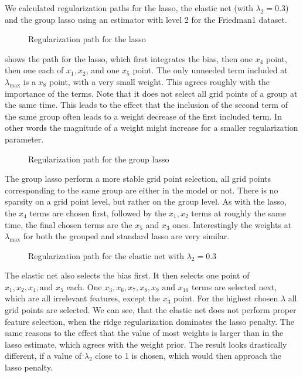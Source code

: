 We calculated regularization paths for the lasso, the elastic net (with
\(\lambda_2 = 0.3\)) and the group lasso using an estimator with level 2 for the
Friedman1 dataset.

\begin{figure}[hbt]
  \centering
  \caption{Regularization path for the lasso}\label{fig:path-lasso}
\end{figure}
 shows the path for the lasso, which first integrates the bias, then one \(x_4\) point, then
one each of \(x_1, x_2\), and one \(x_5\) point.
The only unneeded term included at \(\lambda_\text{max}\) is a \(x_8\) point,
with a very small weight.
This agrees roughly with the importance of the terms.
Note that it does not select all grid points of a group at the same time.
This leads to the effect that the inclusion of the second term of the same group
often leads to a weight decrease of the first included term.
In other words the magnitude of a weight might increase for a smaller
regularization parameter.

\begin{figure}[H]
  \centering
  \caption{Regularization path for the group lasso}
\end{figure}

The group lasso perform a more stable grid point selection, all grid points
corresponding to the same group are either in the model or not.
There is no sparsity on a grid point level, but rather on the group level.
As with the lasso, the \(x_4\) terms are chosen first, followed by the \(x_1,
x_2\) terms at roughly the same time, the final chosen terms are the \(x_5\) and
\(x_3\) ones.
Interestingly the weights at \(\lambda_\text{max}\) for both the grouped and
standard lasso are very similar.

\begin{figure}[H]
  \centering
  \caption{Regularization path for the elastic net with \(\lambda_2 = 0.3\)}
\end{figure}
The elastic net also selects the bias first.
It then selects one point of \(x_1, x_2, x_4,\text{and } x_5\) each.
One \(x_3, x_6, x_7, x_8, x_9 \text{ and } x_{10}\) terms are selected next,
which are all irrelevant features, except the \(x_3\) point.
For the highest chosen \(\lambda\) all grid points are selected.
We can see, that the elastic net does not perform proper feature selection, when
the ridge regularization dominates the lasso penalty.
The same reasons to the effect that the value of most weights is larger than in
the lasso estimate, which agrees with the weight prior.
The result looks drastically different, if a value of \(\lambda_2\) close to 1
is chosen, which would then approach the lasso penalty.

